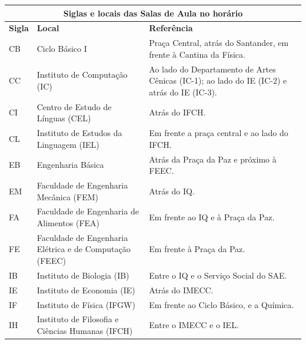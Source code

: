 \begin{table}[ht!]
    \centering
    \begin{tabular}{|l|p{6cm}|p{8cm}|}\hline
        \multicolumn{3}{|c|}{ \textbf{Siglas e locais das Salas de Aula no horário}}\\ \hline

        \textbf{Sigla}  &  \textbf{Local}  &  \textbf{Referência}\\ \hline

        CB  &  Ciclo Básico I  &  Praça Central, atrás do Santander, em frente à Cantina da Física.\\ \hline

        CC  &  Instituto de Computação (IC)  &  Ao lado do Departamento de Artes Cênicas (IC-1); ao lado do IE (IC-2) e atrás do IE (IC-3).\\ \hline

        CI  &  Centro de Estudo de Línguas (CEL)  &  Atrás do IFCH.\\ \hline

        CL  &  Instituto de Estudos da Linguagem (IEL)  &  Em frente a praça central e ao lado do IFCH.\\ \hline

        EB  &  Engenharia Básica  &  Atrás da Praça da Paz e próximo à FEEC.\\ \hline

        EM  &  Faculdade de Engenharia Mecânica (FEM)  &  Atrás do IQ.\\ \hline

        FA  &  Faculdade de Engenharia de Alimentos (FEA)  &  Em frente ao IQ e à Praça da Paz.\\ \hline

        FE  &  Faculdade de Engenharia Elétrica e de Computação (FEEC)  &  Em frente à Praça da Paz.\\ \hline

        IB  &  Instituto de Biologia (IB)  &  Entre o IQ e o Serviço Social do SAE.\\ \hline

        IE  &  Instituto de Economia (IE)  &  Atrás do IMECC.\\ \hline

        IF  &  Instituto de Física (IFGW)  &  Em frente ao Ciclo Básico, e a Química.\\ \hline

        IH  &  Instituto de Filosofia e Ciências Humanas (IFCH)  &  Entre o IMECC e o IEL.\\ \hline


\end{tabular}
\end{table}
